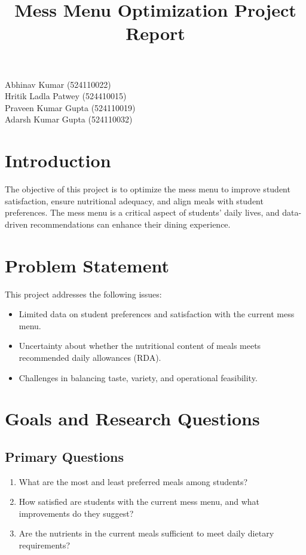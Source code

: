\documentclass[12pt,a4paper]{article}
\title{\textbf{Mess Menu Optimization Project Report}}
\begin{document}
\maketitle
\begin{center}
    
    Abhinav Kumar (524110022) \\
    Hritik Ladla Patwey (524410015) \\ 
    Praveen Kumar Gupta (524110019) \\ 
    Adarsh Kumar Gupta (524110032) \\ 
\end{center}
\newpage

\section{Introduction}
The objective of this project is to optimize the mess menu to improve student satisfaction, ensure nutritional adequacy, and align meals with student preferences. The mess menu is a critical aspect of students' daily lives, and data-driven recommendations can enhance their dining experience.

\section{Problem Statement}
This project addresses the following issues:
\begin{itemize}
    \item Limited data on student preferences and satisfaction with the current mess menu.
    \item Uncertainty about whether the nutritional content of meals meets recommended daily allowances (RDA).
    \item Challenges in balancing taste, variety, and operational feasibility.
\end{itemize}

\section{Goals and Research Questions}
\subsection{Primary Questions}
\begin{enumerate}
    \item What are the most and least preferred meals among students?
    \item How satisfied are students with the current mess menu, and what improvements do they suggest?
    \item Are the nutrients in the current meals sufficient to meet daily dietary requirements?
\end{enumerate}
\end{document}
